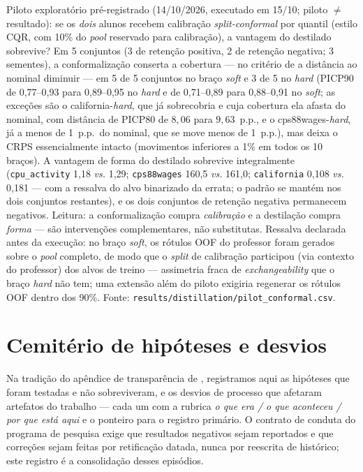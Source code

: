 Piloto exploratório pré-registrado (14/10/2026, executado em 15/10; piloto $\neq$
resultado): se os \emph{dois} alunos recebem calibração
\emph{split-conformal} por quantil (estilo CQR, com 10\% do
\emph{pool} reservado para calibração), a vantagem do destilado
sobrevive? Em 5 conjuntos (3 de retenção positiva, 2 de retenção
negativa; 3
sementes), a conformalização conserta a cobertura --- no critério de a
distância ao nominal diminuir --- em 5 de 5 conjuntos no braço
\emph{soft} e 3 de 5 no \emph{hard} (PICP90 de 0,77--0,93 para
0,89--0,95 no \emph{hard} e de 0,71--0,89 para 0,88--0,91 no
\emph{soft}; as exceções são o california-\emph{hard}, que já
sobrecobria e cuja cobertura ela afasta do nominal, com distância de
PICP80 de $8{,}06$ para $9{,}63$~p.p., e o cps88wages-\emph{hard},
já a menos de 1~p.p.\ do nominal, que se move menos de
1~p.p.), mas deixa o CRPS essencialmente
intacto (movimentos inferiores a 1\% em todos os 10 braços). A
vantagem de forma do destilado sobrevive integralmente
(\texttt{cpu\_activity} 1,18 \emph{vs.} 1,29; \texttt{cps88wages}
160,5 \emph{vs.} 161,0; \texttt{california} 0,108 \emph{vs.} 0,181 ---
com a ressalva do alvo binarizado da errata; o padrão se mantém nos
dois conjuntos restantes), e
os dois conjuntos de retenção negativa permanecem negativos.
Leitura: a conformalização compra
\emph{calibração} e a destilação compra \emph{forma} --- são
intervenções complementares, não substitutas. Ressalva declarada antes
da execução: no braço \emph{soft}, os rótulos OOF do professor foram
gerados sobre o \emph{pool} completo, de modo que o \emph{split} de
calibração participou (via contexto do professor) dos alvos de treino
--- assimetria fraca de \emph{exchangeability} que o braço \emph{hard}
não tem; uma extensão além do piloto exigiria regenerar os rótulos OOF
dentro dos 90\%. Fonte:
\texttt{results/\allowbreak distillation/\allowbreak pilot\_\allowbreak conformal.\allowbreak csv}.

\section{Cemitério de hipóteses e desvios}
\label{sec:suple-cemiterio}

Na tradição do apêndice de transparência de \citet{grinsztajn2022},
registramos aqui as hipóteses que foram testadas e não sobreviveram, e
os desvios de processo que afetaram artefatos do trabalho --- cada um
com a rubrica \emph{o que era / o que aconteceu / por que está aqui} e
o ponteiro para o registro primário. O contrato de conduta do
programa de pesquisa exige que resultados negativos sejam reportados e
que correções sejam feitas por retificação datada, nunca por reescrita
de histórico; este registro é a consolidação desses episódios.

